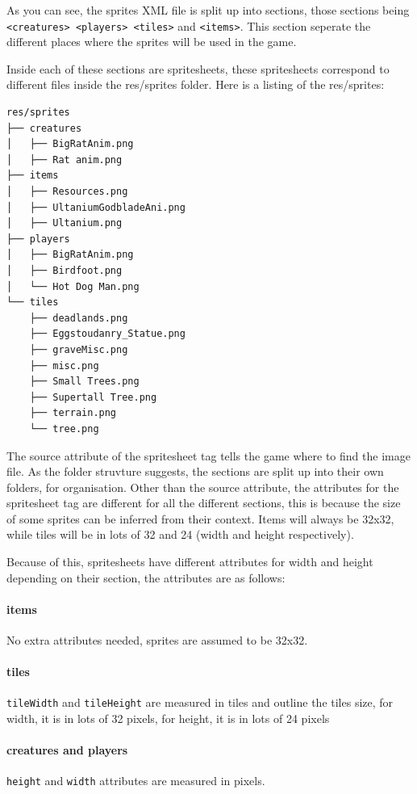 \documentclass{book}
\begin{document}
	As you can see, the sprites XML file is split up into sections, those sections being \texttt{<creatures> <players> <tiles>} and \texttt{<items>}. This section seperate the different places where the sprites will be used in the game.

Inside each of these sections are spritesheets, these spritesheets correspond to different files inside the res/sprites folder. Here is a listing of the res/sprites:

\begin{lstlisting}
res/sprites
├── creatures
│   ├── BigRatAnim.png
│   ├── Rat anim.png
├── items
│   ├── Resources.png
│   ├── UltaniumGodbladeAni.png
│   ├── Ultanium.png
├── players
│   ├── BigRatAnim.png
│   ├── Birdfoot.png
│   └── Hot Dog Man.png
└── tiles
    ├── deadlands.png
    ├── Eggstoudanry_Statue.png
    ├── graveMisc.png
    ├── misc.png
    ├── Small Trees.png
    ├── Supertall Tree.png
    ├── terrain.png
    └── tree.png
\end{lstlisting}

The source attribute of the spritesheet tag tells the game where to find the image file. As the folder struvture suggests, the sections are split up into their own folders, for organisation. Other than the source attribute, the attributes for the spritesheet tag are different for all the different sections, this is because the size of some sprites can be inferred from their context. Items will always be 32x32, while tiles will be in lots of 32 and 24 (width and height respectively). 

Because of this, spritesheets have different attributes for width and height depending on their section, the attributes are as follows:

\paragraph{items} No extra attributes needed, sprites are assumed to be 32x32.
\paragraph{tiles} \texttt{tileWidth} and \texttt{tileHeight} are measured in tiles and outline the tiles size, for width, it is in lots of 32 pixels, for height, it is in lots of 24 pixels
\paragraph{creatures and players} \texttt{height} and \texttt{width} attributes are measured in pixels.
\end{document}
